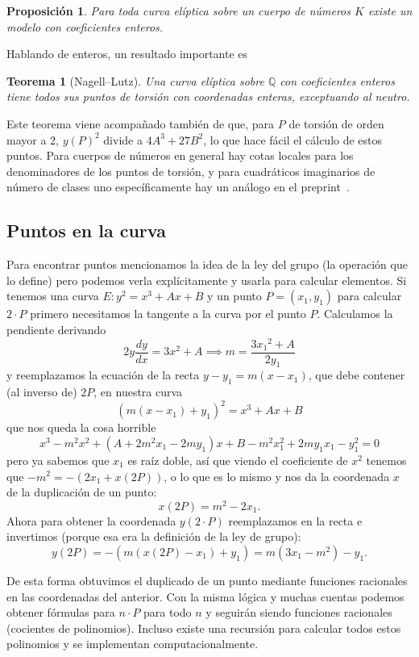 \documentclass[a4paper]{book}
\theoremstyle{definition}
\theoremstyle{plain}
\newtheorem*{theorem*}{Teorema}
\newtheorem*{prop*}{Proposición}
\newcommand{\QQ}{\mathbb{Q}}
\begin{document}
\begin{prop*}
Para toda curva elíptica sobre un cuerpo de números $K$ existe un modelo con coeficientes enteros.
\end{prop*}

Hablando de enteros, un resultado importante es 

\begin{theorem*}[Nagell--Lutz]\label{thm:NagellLutz}
Una curva elíptica sobre $\QQ$ con coeficientes enteros tiene todos sus puntos de torsión con coordenadas enteras, exceptuando al neutro.
\end{theorem*}

Este teorema viene acompañado también de que, para $P$ de torsión de orden mayor a 2, ${y(P)}^2$ divide a $4A^3+27B^2$, lo que hace fácil el cálculo de estos puntos. Para cuerpos de números en general hay cotas locales para los denominadores de los puntos de torsión, y para cuadráticos imaginarios de número de clases uno específicamente hay un análogo en el preprint~\cite{MondalChalilBanerjee2025}.

\subsection{Puntos en la curva}

Para encontrar puntos mencionamos la idea de la ley del grupo (la operación que lo define) pero podemos verla explícitamente y usarla para calcular elementos. Si tenemos una curva $E: y^2 = x^3+Ax+B$ y un punto $P = (x_1,y_1)$ para calcular $2\cdot P$ primero necesitamos la tangente a la curva por el punto $P$. Calculamos la pendiente derivando
\[
2y\frac{dy}{dx} = 3x^2+A \implies m=\frac{3{x_1}^2+A}{2y_1}
\]
y reemplazamos la ecuación de la recta $y-y_1 = m (x-x_1)$, que debe contener (al inverso de) $2 P$, en nuestra curva
\[
{(m(x-x_1)+y_1)}^2=x^3+Ax+B
\]
que nos queda la cosa horrible
\[
x^3-m^2x^2+(A+2m^2x_1-2m y_1)x+B-m^2 x_1^2+2my_1x_1-y_1^2=0
\]
pero ya sabemos que $x_1$ es raíz doble, así que viendo el coeficiente de $x^2$ tenemos que $-m^2 = -(2x_1 + x(2P))$, o lo que es lo mismo y nos da la coordenada $x$ de la duplicación de un punto:
\[
x(2P) = m^2 -2x_1.
\]
Ahora para obtener la coordenada $y(2\cdot P)$ reemplazamos en la recta e invertimos (porque esa era la definición de la ley de grupo):
\[
y(2P) = -(m(x(2P)-x_1)+y_1) = m(3x_1 - m^2) - y_1.
\]

De esta forma obtuvimos el duplicado de un punto mediante funciones racionales en las coordenadas del anterior. Con la misma lógica y muchas cuentas podemos obtener fórmulas para $n\cdot P$ para todo $n$ y seguirán siendo funciones racionales (cocientes de polinomios). Incluso existe una recursión para calcular todos estos polinomios y se implementan computacionalmente.
\end{document}

